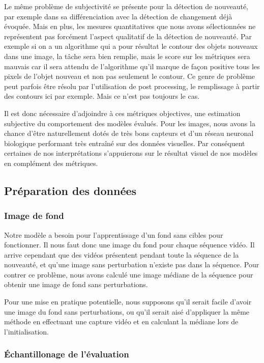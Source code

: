 	Le même problème de subjectivité se présente pour la détection de nouveauté, par exemple dans sa différenciation avec la détection de changement déjà évoquée. Mais en plus, les mesures quantitatives que nous avons sélectionnées ne représentent pas forcément l'aspect qualitatif de la détection de nouveauté. Par exemple si on a un algorithme qui a pour résultat le contour des objets nouveaux dans une image, la tâche sera bien remplie, mais le score sur les métriques sera mauvais car il sera attendu de l'algorithme qu'il marque de façon positive tous les pixels de l'objet nouveau et non pas seulement le contour. Ce genre de problème peut parfois être résolu par l'utilisation de post processing, le remplissage à partir des contours ici par exemple. Mais ce n'est pas toujours le cas.

	Il est donc nécessaire d'adjoindre à ces métriques objectives, une estimation subjective du comportement des modèles évalués. Pour les images, nous avons la chance d'être naturellement dotés de très bons capteurs et d'un réseau neuronal biologique performant très entraîné sur des données visuelles. Par conséquent certaines de nos interprétations s'appuierons sur le résultat visuel de nos modèles en complément des métriques.

	\subsection{Préparation des données}

	\subsubsection{Image de fond}

	Notre modèle a besoin pour l'apprentissage d'un fond sans cibles pour fonctionner. Il nous faut donc une image du fond pour chaque séquence vidéo. Il arrive cependant que des vidéos présentent pendant toute la séquence de la nouveauté, et qu'une image sans perturbation n'existe pas dans la séquence. Pour contrer ce problème, nous avons calculé une image médiane de la séquence pour obtenir une image de fond sans perturbations.

	Pour une mise en pratique potentielle, nous supposons qu'il serait facile d'avoir une image du fond sans perturbations, ou qu'il serait aisé d'appliquer la même méthode en effectuant une capture vidéo et en calculant la médiane lors de l'initialisation.
	
	\subsubsection{Échantillonage de l'évaluation}

